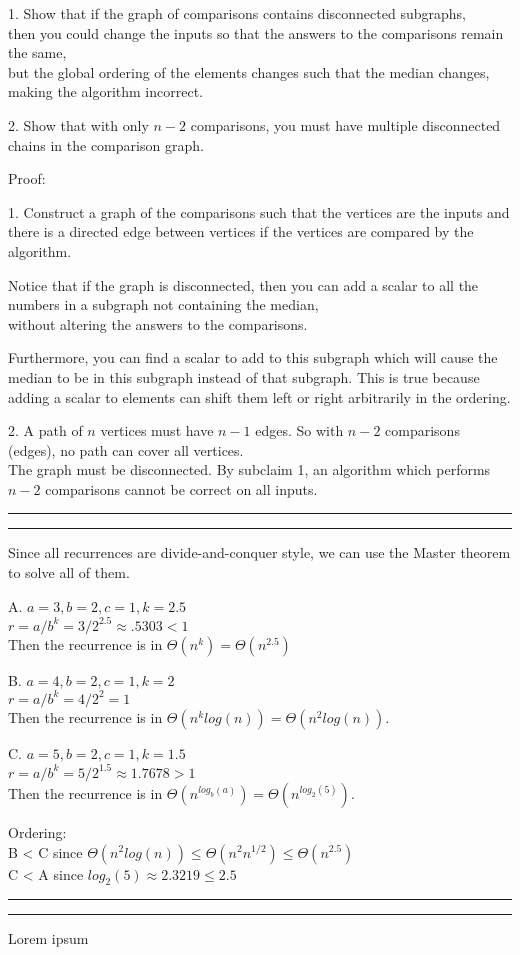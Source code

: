 \documentclass[11pt,letterpaper]{article}
\newcommand{\question}[1] {\vspace{.25in} \hrule\vspace{0.5em}
\noindent{\bf #1} \vspace{0.5em}
\hrule \vspace{.10in}}
\begin{document}
1. Show that if the graph of comparisons contains disconnected subgraphs,\\
then you could change the inputs so that the answers to the comparisons remain the same,\\
but the global ordering of the elements changes such that the median changes, making the algorithm incorrect.

2. Show that with only $n-2$ comparisons, you must have multiple disconnected chains in the comparison graph.

Proof:

1. Construct a graph of the comparisons such that the vertices are the inputs and there is a directed edge
between vertices if the vertices are compared by the algorithm.

Notice that if the graph is disconnected, then you can add a scalar to all the numbers in a subgraph not containing the median, \\
without altering the answers to the comparisons.

Furthermore, you can find a scalar to add to this subgraph which will cause the median to be in this subgraph instead of that subgraph.
This is true because adding a scalar to elements can shift them left or right arbitrarily in the ordering.

2. A path of $n$ vertices must have $n-1$ edges. So with $n-2$ comparisons (edges), no path can cover all vertices.\\
The graph must be disconnected. By subclaim 1, an algorithm which performs $n-2$ comparisons cannot be correct on all inputs.

\question{1d.}
Since all recurrences are divide-and-conquer style, we can use the Master theorem to solve all of them.

A. $a=3, b=2, c=1, k=2.5$\\
$r = a/b^{k} = 3/2^{2.5} \approx .5303 < 1$\\
Then the recurrence is in $\Theta(n^k) = \Theta(n^{2.5})$

B. $a=4, b=2, c=1, k=2$\\
$r = a/b^{k} = 4/2^{2} = 1$\\
Then the recurrence is in $\Theta(n^k log(n)) = \Theta(n^{2} log(n))$.

C. $a=5, b=2, c=1, k=1.5$\\
$r = a/b^{k} = 5/2^{1.5} \approx 1.7678 > 1$\\
Then the recurrence is in $\Theta(n^{log_b(a)}) = \Theta(n^{log_2(5)})$.

Ordering: \\
B < C since $\Theta(n^{2} log(n)) \leq \Theta(n^{2} n^{1/2}) \leq \Theta(n^{2.5})$\\
C < A since $log_2(5) \approx 2.3219 \leq 2.5$


\question{2}
Lorem ipsum
\end{document}
